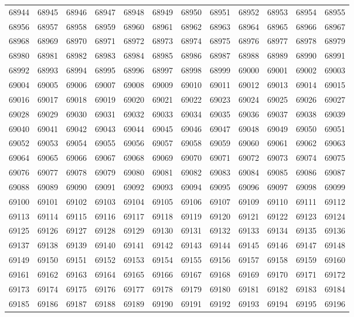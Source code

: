 \begin{center}
\begin{longtable}{llllllllllll}
68944 &68945 &68946 &68947 &68948 &68949 &68950 &68951 &68952 &68953 &68954 &68955 \\
68956 &68957 &68958 &68959 &68960 &68961 &68962 &68963 &68964 &68965 &68966 &68967 \\
68968 &68969 &68970 &68971 &68972 &68973 &68974 &68975 &68976 &68977 &68978 &68979 \\
68980 &68981 &68982 &68983 &68984 &68985 &68986 &68987 &68988 &68989 &68990 &68991 \\
68992 &68993 &68994 &68995 &68996 &68997 &68998 &68999 &69000 &69001 &69002 &69003 \\
69004 &69005 &69006 &69007 &69008 &69009 &69010 &69011 &69012 &69013 &69014 &69015 \\
69016 &69017 &69018 &69019 &69020 &69021 &69022 &69023 &69024 &69025 &69026 &69027 \\
69028 &69029 &69030 &69031 &69032 &69033 &69034 &69035 &69036 &69037 &69038 &69039 \\
69040 &69041 &69042 &69043 &69044 &69045 &69046 &69047 &69048 &69049 &69050 &69051 \\
69052 &69053 &69054 &69055 &69056 &69057 &69058 &69059 &69060 &69061 &69062 &69063 \\
69064 &69065 &69066 &69067 &69068 &69069 &69070 &69071 &69072 &69073 &69074 &69075 \\
69076 &69077 &69078 &69079 &69080 &69081 &69082 &69083 &69084 &69085 &69086 &69087 \\
69088 &69089 &69090 &69091 &69092 &69093 &69094 &69095 &69096 &69097 &69098 &69099 \\
69100 &69101 &69102 &69103 &69104 &69105 &69106 &69107 &69109 &69110 &69111 &69112 \\
69113 &69114 &69115 &69116 &69117 &69118 &69119 &69120 &69121 &69122 &69123 &69124 \\
69125 &69126 &69127 &69128 &69129 &69130 &69131 &69132 &69133 &69134 &69135 &69136 \\
69137 &69138 &69139 &69140 &69141 &69142 &69143 &69144 &69145 &69146 &69147 &69148 \\
69149 &69150 &69151 &69152 &69153 &69154 &69155 &69156 &69157 &69158 &69159 &69160 \\
69161 &69162 &69163 &69164 &69165 &69166 &69167 &69168 &69169 &69170 &69171 &69172 \\
69173 &69174 &69175 &69176 &69177 &69178 &69179 &69180 &69181 &69182 &69183 &69184 \\
69185 &69186 &69187 &69188 &69189 &69190 &69191 &69192 &69193 &69194 &69195 &69196 \\

\end{longtable}
\end{center}

